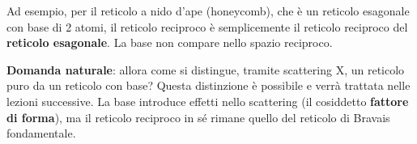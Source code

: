 Ad esempio, per il reticolo a nido d'ape (honeycomb), che è un reticolo esagonale con base di 2 atomi, il reticolo reciproco è semplicemente il reticolo reciproco del \textbf{reticolo esagonale}. La base non compare nello spazio reciproco.


\textbf{Domanda naturale}: allora come si distingue, tramite scattering X, un reticolo puro da un reticolo con base? Questa distinzione è possibile e verrà trattata nelle lezioni successive. La base introduce effetti nello scattering (il cosiddetto \textbf{fattore di forma}), ma il reticolo reciproco in sé rimane quello del reticolo di Bravais fondamentale.
